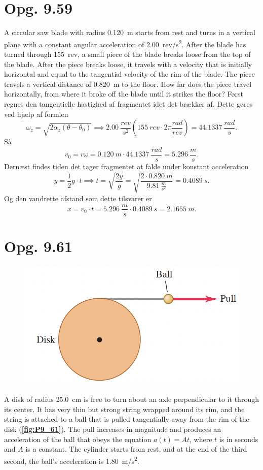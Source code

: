 \documentclass[12pt]{article}
\begin{document}
\section*{Opg. 9.59}
A circular saw blade with radius \qty{0,120}{m} starts from rest and turns in a vertical plane with a constant angular acceleration of \qty{2,00}{rev/s^2}. After the blade has turned through \qty{155}{rev}, a small piece of the blade breaks loose from the top of the blade. After the piece breaks loose, it travels with a velocity that is initially horizontal and equal to the tangential velocity of the rim of the blade. The piece travels a vertical distance of \qty{0,820}{m} to the floor. How far does the piece travel horizontally, from where it broke off the blade until it strikes the floor?
\bigbreak
Først regnes den tangentielle hastighed af fragmentet idet det brækker af. Dette gøres ved hjælp af formlen
\[
  \omega_z = \sqrt{2\alpha_z\left( \theta - \theta_0 \right)} \implies \qty{2,00}{\frac{rev}{s^2}\left( \qty{155}{rev}\cdot 2\pi \frac{rad}{rev} \right) = \qty{44,1337}{\frac{rad}{s}}
}
.\] 
Så
\[
v_0 = r\omega = \qty{0,120}{m} \cdot \qty{44,1337}{\frac{rad}{s}} = \qty{5,296}{\frac{m}{s}}
.\] 
Dernæst findes tiden det tager fragmentet at falde under konstant acceleration
\[
y = \frac{1}{2}g\cdot t \implies t = \sqrt{\frac{2y}{g}} = \sqrt{\frac{2\cdot \qty{0,820}{m}}{\qty{9,81}{\frac{m}{s^2}}}} =\qty{0,4089}{s} 
.\] 
Og den vandrette afstand som dette tilsvarer er
\[
x = v_0 \cdot t = \qty{5,296}{\frac{m}{s}}\cdot \qty{0,4089}{s} = \qty{2,1655}{m} 
.\]

\section*{Opg. 9.61}

\begin{figure} [ht]
  \centering
  \caption{}
  \includegraphics[width=0.5\linewidth]{../figures/P9_61.png}
  \label{fig:P9_61}
\end{figure}

A disk of radius \qty{25,0}{cm} is free to turn about an axle perpendicular to it through its center. It has very thin but strong string wrapped around its rim, and the string is attached to a ball that is pulled tangentially away from the rim of the disk (\textbf{\autoref{fig:P9_61}}). The pull increases in magnitude and produces an acceleration of the ball that obeys the equation $a(t) = At$, where $t$ is in seconds and $A$ is a constant. The cylinder starts from rest, and at the end of the third second, the ball’s acceleration
is \qty{1,80}{m/s^2}.
\end{document}
